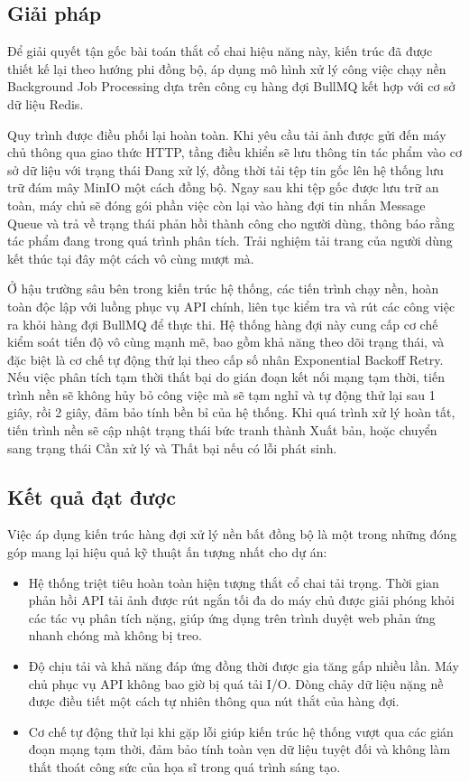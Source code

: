 \subsection{Giải pháp}
Để giải quyết tận gốc bài toán thắt cổ chai hiệu năng này, kiến trúc đã được thiết kế lại theo hướng phi đồng bộ, áp dụng mô hình xử lý công việc chạy nền Background Job Processing dựa trên công cụ hàng đợi BullMQ kết hợp với cơ sở dữ liệu Redis.

Quy trình được điều phối lại hoàn toàn. Khi yêu cầu tải ảnh được gửi đến máy chủ thông qua giao thức HTTP, tầng điều khiển sẽ lưu thông tin tác phẩm vào cơ sở dữ liệu với trạng thái Đang xử lý, đồng thời tải tệp tin gốc lên hệ thống lưu trữ đám mây MinIO một cách đồng bộ. Ngay sau khi tệp gốc được lưu trữ an toàn, máy chủ sẽ đóng gói phần việc còn lại vào hàng đợi tin nhắn Message Queue và trả về trạng thái phản hồi thành công cho người dùng, thông báo rằng tác phẩm đang trong quá trình phân tích. Trải nghiệm tải trang của người dùng kết thúc tại đây một cách vô cùng mượt mà.

Ở hậu trường sâu bên trong kiến trúc hệ thống, các tiến trình chạy nền, hoàn toàn độc lập với luồng phục vụ API chính, liên tục kiểm tra và rút các công việc ra khỏi hàng đợi BullMQ để thực thi. Hệ thống hàng đợi này cung cấp cơ chế kiểm soát tiến độ vô cùng mạnh mẽ, bao gồm khả năng theo dõi trạng thái, và đặc biệt là cơ chế tự động thử lại theo cấp số nhân Exponential Backoff Retry. Nếu việc phân tích tạm thời thất bại do gián đoạn kết nối mạng tạm thời, tiến trình nền sẽ không hủy bỏ công việc mà sẽ tạm nghỉ và tự động thử lại sau 1 giây, rồi 2 giây, đảm bảo tính bền bỉ của hệ thống. Khi quá trình xử lý hoàn tất, tiến trình nền sẽ cập nhật trạng thái bức tranh thành Xuất bản, hoặc chuyển sang trạng thái Cần xử lý và Thất bại nếu có lỗi phát sinh.

\subsection{Kết quả đạt được}
Việc áp dụng kiến trúc hàng đợi xử lý nền bất đồng bộ là một trong những đóng góp mang lại hiệu quả kỹ thuật ấn tượng nhất cho dự án:
\begin{itemize}
    \item Hệ thống triệt tiêu hoàn toàn hiện tượng thắt cổ chai tải trọng. Thời gian phản hồi API tải ảnh được rút ngắn tối đa do máy chủ được giải phóng khỏi các tác vụ phân tích nặng, giúp ứng dụng trên trình duyệt web phản ứng nhanh chóng mà không bị treo.
    \item Độ chịu tải và khả năng đáp ứng đồng thời được gia tăng gấp nhiều lần. Máy chủ phục vụ API không bao giờ bị quá tải I/O. Dòng chảy dữ liệu nặng nề được điều tiết một cách tự nhiên thông qua nút thắt của hàng đợi.
    \item Cơ chế tự động thử lại khi gặp lỗi giúp kiến trúc hệ thống vượt qua các gián đoạn mạng tạm thời, đảm bảo tính toàn vẹn dữ liệu tuyệt đối và không làm thất thoát công sức của họa sĩ trong quá trình sáng tạo.
\end{itemize}
